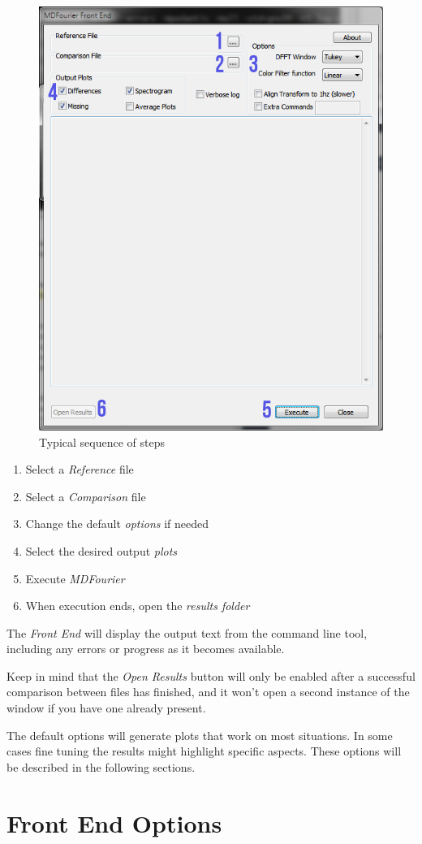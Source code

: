 \documentclass[10pt,a4paper]{report}
\begin{document}
\begin{appendices}
\begin{figure}[H]
	\centering
	\includegraphics[width=0.6\linewidth]{images/GUI/GUI2.png}
	\caption[Steps]{Typical sequence of steps}
	\label{fig:gui2}
\end{figure}

\begin{enumerate}
	\item Select a \textit{Reference} file
	\item Select a \textit{Comparison} file
	\item Change the default \textit{options} if needed
	\item Select the desired output \textit{plots}
	\item Execute \textit{MDFourier}
	\item When execution ends, open the \textit{results folder}
\end{enumerate}

The \textit{Front End} will display the output text from the command line tool, including any errors or progress as it becomes available.

Keep in mind that the \textit{Open Results} button will only be enabled after a successful comparison between files has finished, and it won't open a second instance of the window if you have one already present.

The default options will generate plots that work on most situations. In some cases fine tuning the results might highlight specific aspects. These options will be described in the following sections.

\section{Front End Options}


\end{appendices}
\end{document}
